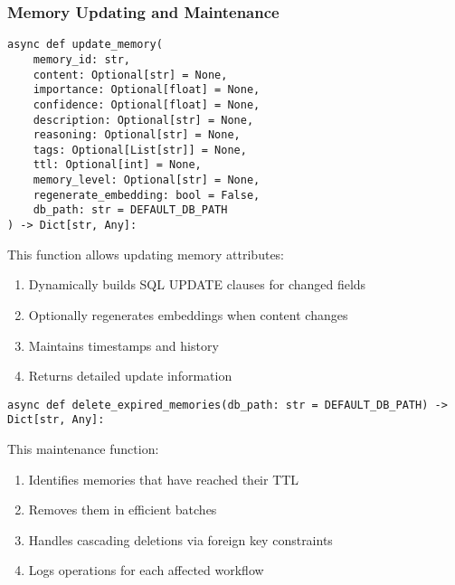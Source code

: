 \documentclass[12pt,a4paper]{article}
\begin{document}
\subsubsection*{Memory Updating and Maintenance}
\begin{pageablecode}
\begin{verbatim}
async def update_memory(
    memory_id: str,
    content: Optional[str] = None,
    importance: Optional[float] = None,
    confidence: Optional[float] = None,
    description: Optional[str] = None,
    reasoning: Optional[str] = None,
    tags: Optional[List[str]] = None,
    ttl: Optional[int] = None,
    memory_level: Optional[str] = None,
    regenerate_embedding: bool = False,
    db_path: str = DEFAULT_DB_PATH
) -> Dict[str, Any]:
\end{verbatim}
\end{pageablecode}
This function allows updating memory attributes:
\begin{enumerate}[label=\arabic*.]
    \item Dynamically builds SQL UPDATE clauses for changed fields
    \item Optionally regenerates embeddings when content changes
    \item Maintains timestamps and history
    \item Returns detailed update information
\end{enumerate}

\begin{pageablecode}
\begin{verbatim}
async def delete_expired_memories(db_path: str = DEFAULT_DB_PATH) -> Dict[str, Any]:
\end{verbatim}
\end{pageablecode}
This maintenance function:
\begin{enumerate}[label=\arabic*.]
    \item Identifies memories that have reached their TTL
    \item Removes them in efficient batches
    \item Handles cascading deletions via foreign key constraints
    \item Logs operations for each affected workflow
\end{enumerate}
\end{document}
